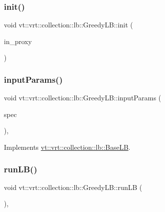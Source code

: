 \subsubsection{\texorpdfstring{init()}{init()}}
{\footnotesize\ttfamily void vt\+::vrt\+::collection\+::lb\+::\+Greedy\+L\+B\+::init (\begin{DoxyParamCaption}\item[{\hyperlink{structvt_1_1objgroup_1_1proxy_1_1_proxy}{objgroup\+::proxy\+::\+Proxy}$<$ \hyperlink{structvt_1_1vrt_1_1collection_1_1lb_1_1_greedy_l_b}{Greedy\+LB} $>$}]{in\+\_\+proxy }\end{DoxyParamCaption})}

\mbox{\label{structvt_1_1vrt_1_1collection_1_1lb_1_1_greedy_l_b_aec90a76fdcb1d57c9edfb6403bcc5181}} 
\subsubsection{\texorpdfstring{input\+Params()}{inputParams()}}
{\footnotesize\ttfamily void vt\+::vrt\+::collection\+::lb\+::\+Greedy\+L\+B\+::input\+Params (\begin{DoxyParamCaption}\item[{\hyperlink{structvt_1_1vrt_1_1collection_1_1balance_1_1_spec_entry}{balance\+::\+Spec\+Entry} $\ast$}]{spec }\end{DoxyParamCaption})\hspace{0.3cm}{\ttfamily [override]}, {\ttfamily [virtual]}}



Implements \hyperlink{structvt_1_1vrt_1_1collection_1_1lb_1_1_base_l_b_a555e29aadfd428383464d6dd007506b6}{vt\+::vrt\+::collection\+::lb\+::\+Base\+LB}.

\mbox{\label{structvt_1_1vrt_1_1collection_1_1lb_1_1_greedy_l_b_ab5e726f6fe7aa749ea6e0e2a45171d36}} 
\subsubsection{\texorpdfstring{run\+L\+B()}{runLB()}}
{\footnotesize\ttfamily void vt\+::vrt\+::collection\+::lb\+::\+Greedy\+L\+B\+::run\+LB (\begin{DoxyParamCaption}{ }\end{DoxyParamCaption})\hspace{0.3cm}{\ttfamily [override]}, {\ttfamily [virtual]}}



